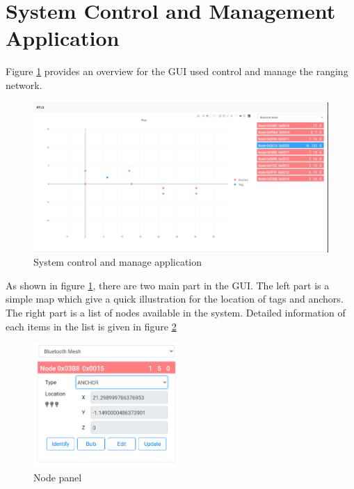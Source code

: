\documentclass[\main/main.tex]{subfiles}
\begin{document}
\section{System Control and Management Application}
Figure \ref{fig:system_control_and_manage_application} provides an overview for the GUI used control and manage the ranging network.
\begin{figure}[H]   
    \centering
    \includegraphics[width=1\textwidth]{system_control_and_manage_application.png}
    \caption{System control and manage application}
    \label{fig:system_control_and_manage_application}
\end{figure}
As shown in figure \ref{fig:system_control_and_manage_application}, there are two main part in the GUI. The left part is a simple map which give a quick illustration for the location of tags and anchors. The right part is a list of nodes available in the system. Detailed information of each items in the list is given in figure \ref{fig:control_and_manage_pannel}

\begin{figure}[H]   
    \centering
    \includegraphics[width=0.5\textwidth]{control_and_manage_pannel.png}
    \caption{Node panel}
    \label{fig:control_and_manage_pannel}
\end{figure}
\end{document}

